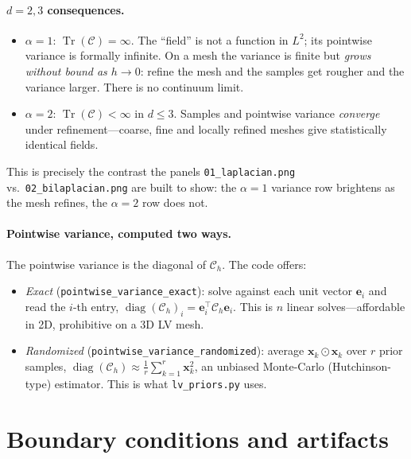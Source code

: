 \documentclass[11pt]{article}
\theoremstyle{definition}
\theoremstyle{plain}
\theoremstyle{remark}
\newcommand{\Cc}{\mathcal{C}}
\newcommand{\Tr}{\operatorname{Tr}}
\newcommand{\bx}{\bm{x}}
\begin{document}
\paragraph{$d=2,3$ consequences.}
\begin{itemize}[nosep]
  \item $\alpha=1$: $\Tr(\Cc)=\infty$. The ``field'' is not a function in
        $L^2$; its pointwise variance is formally infinite. On a mesh the
        variance is finite but \emph{grows without bound as $h\to 0$}: refine
        the mesh and the samples get rougher and the variance larger. There is
        no continuum limit.
  \item $\alpha=2$: $\Tr(\Cc)<\infty$ in $d\le 3$. Samples and pointwise
        variance \emph{converge} under refinement---coarse, fine and locally
        refined meshes give statistically identical fields.
\end{itemize}
This is precisely the contrast the panels \texttt{01\_laplacian.png} vs.\
\texttt{02\_bilaplacian.png} are built to show: the $\alpha=1$ variance row
brightens as the mesh refines, the $\alpha=2$ row does not.

\paragraph{Pointwise variance, computed two ways.}
The pointwise variance is the diagonal of $\Cc_h$. The code offers:
\begin{itemize}[nosep]
\item \emph{Exact} (\texttt{pointwise\_variance\_exact}): solve against each
      unit vector $\bm e_i$ and read the $i$-th entry,
      $\operatorname{diag}(\Cc_h)_i = \bm e_i^\top \Cc_h \bm e_i$. This is
      $n$ linear solves---affordable in 2D, prohibitive on a 3D LV mesh.
\item \emph{Randomized} (\texttt{pointwise\_variance\_randomized}): average
      $\bx_k \odot \bx_k$ over $r$ prior samples,
      $\operatorname{diag}(\Cc_h) \approx \frac1r\sum_{k=1}^r \bx_k^2$,
      an unbiased Monte-Carlo (Hutchinson-type) estimator. This is what
      \texttt{lv\_priors.py} uses.
\end{itemize}

\section{Boundary conditions and artifacts}
\label{sec:bc}
\end{document}

